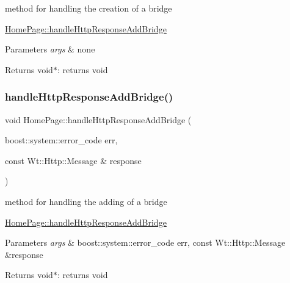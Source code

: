 method for handling the creation of a bridge 

\hyperlink{class_home_page_a5a1923f90a2ac6367869f9423e9a3559}{Home\+Page\+::handle\+Http\+Response\+Add\+Bridge} 
\begin{DoxyParams}{Parameters}
{\em args} & none \\
\hline
\end{DoxyParams}
\begin{DoxyReturn}{Returns}
void$\ast$\+: returns void 
\end{DoxyReturn}
\mbox{\label{class_home_page_a5a1923f90a2ac6367869f9423e9a3559}} 
\subsubsection{\texorpdfstring{handle\+Http\+Response\+Add\+Bridge()}{handleHttpResponseAddBridge()}}
{\footnotesize\ttfamily void Home\+Page\+::handle\+Http\+Response\+Add\+Bridge (\begin{DoxyParamCaption}\item[{boost\+::system\+::error\+\_\+code}]{err,  }\item[{const Wt\+::\+Http\+::\+Message \&}]{response }\end{DoxyParamCaption})\hspace{0.3cm}{\ttfamily [private]}}



method for handling the adding of a bridge 

\hyperlink{class_home_page_a5a1923f90a2ac6367869f9423e9a3559}{Home\+Page\+::handle\+Http\+Response\+Add\+Bridge} 
\begin{DoxyParams}{Parameters}
{\em args} & boost\+::system\+::error\+\_\+code err, const Wt\+::\+Http\+::\+Message \&response \\
\hline
\end{DoxyParams}
\begin{DoxyReturn}{Returns}
void$\ast$\+: returns void 
\end{DoxyReturn}
\mbox{\label{class_home_page_a9fd215402b2cc96281c39454e9c70d69}} 
